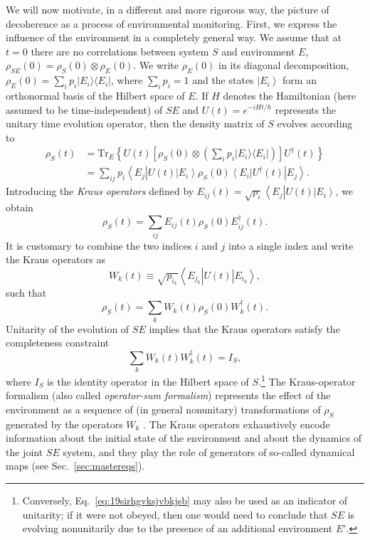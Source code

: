 \documentclass[3p,sort&compress]{elsarticle}
\newcommand{\bra}[1]{\left\langle{#1}\right\vert}
\newcommand{\ket}[1]{\left\vert{#1}\right\rangle}
\newcommand{\ketbra}[2]{\ensuremath{|{#1 \rangle}{\langle #2}|}}
\newcommand{\E}{\ensuremath{e}}
\newcommand{\I}{\ensuremath{i}}
\newcommand{\op}[1]{#1}
\begin{document}
We will now motivate, in a different and more rigorous way, the picture of decoherence as a process of environmental monitoring. First, we express the influence of the environment in a completely general way. We assume that at $t=0$ there are no correlations between system $S$ and environment $E$, $\op{\rho}_{SE}(0) = \op{\rho}_S(0) \otimes \op{\rho}_E(0)$. We write $\op{\rho}_E(0)$ in its diagonal decomposition, $\op{\rho}_E(0) = \sum_i p_i \ketbra{E_i}{E_i}$, where $\sum_i p_i =1$ and the states $\ket{E_i}$ form an orthonormal basis of the Hilbert space of $E$. If $H$ denotes the Hamiltonian (here assumed to be time-independent) of $SE$ and $U(t) = \E^{-\I H t/\hbar}$ represents the unitary time evolution operator, then the density matrix of $S$ evolves according to 
%
\begin{align}
  \label{eq:1slvjhvkjfkjvsj0}
  \op{\rho}_S(t) &= \text{Tr}_E \left\{ U(t) \left[ \op{\rho}_S(0) \otimes \left( \sum_i p_i \ketbra{E_i}{E_i} \right) \right] U^\dagger(t) \right\}\nonumber \\
&= \sum_{ij} p_i \bra{E_j} U(t) \ket{E_i} \op{\rho}_S(0)\bra{E_i} U^\dagger(t) \ket{E_j}.
\end{align}
%
Introducing the \emph{Kraus operators} \cite{Kraus:1971:ii,Kraus:1983:ee} defined by $E_{ij}(t) = \sqrt{p_i} \bra{E_j} U(t) \ket{E_i}$, we obtain
%
\begin{equation}
 \op{\rho}_S(t) = \sum_{ij} E_{ij}(t) \op{\rho}_S(0) E^\dagger_{ij}(t).
\end{equation}
%
It is customary to combine the two indices $i$ and $j$ into a single index and write the Kraus operators as
%
\begin{equation}
  \label{eq:worihfvsjvttrafs2}
  W_k(t) \equiv \sqrt{p_{i_k}} \bra{E_{j_k}} U(t) \ket{E_{i_k}},
\end{equation}
%
such that 
%
\begin{equation}
\label{eq:dfjsb1}
 \op{\rho}_S(t) = \sum_k W_k(t) \op{\rho}_S(0) W^\dagger_k(t).
\end{equation}
%
Unitarity of the evolution of $SE$ implies that the Kraus operators satisfy the completeness constraint
%
\begin{equation}
  \label{eq:19sirhgvksjvbkjsb}
\sum_k W_k(t) W^\dagger_k(t) = I_S,
\end{equation}
%
where $I_S$ is the identity operator in the Hilbert space of $S$.\footnote{Conversely, Eq.~\eqref{eq:19sirhgvksjvbkjsb} may also be used as an indicator of unitarity; if it were not obeyed, then one would need to conclude that $SE$ is evolving nonunitarily due to the presence of an additional environment $E'$.} The Kraus-operator formalism (also called \emph{operator-sum formalism}) represents the effect of the environment as a sequence of (in general nonunitary) transformations of $\op{\rho}_S$ generated by the operators $W_k$ \cite{Breuer:2002:oq,Alicki:2007:uu}. The Kraus operators exhaustively encode information about the initial state of the environment and about the dynamics of the joint $SE$ system, and they play the role of generators of so-called dynamical maps (see Sec.~\ref{sec:mastereqs}). 
\end{document}

